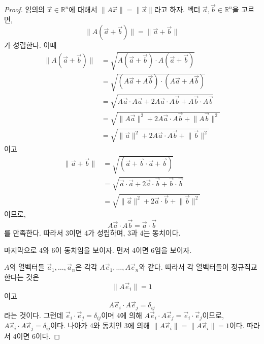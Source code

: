 \documentclass[sections/engineering_mathematics_lecture_note.tex]{subfiles}
\begin{document}
\begin{proof}
    임의의 $\vec x \in \mathbb R^n$에 대해서 $\lVert A \vec x \rVert = \lVert \vec x \rVert$라고 하자.
    벡터 $\vec a, \vec b \in \mathbb R^n$을 고르면,
    \begin{equation*}
        \lVert A (\vec a + \vec b) \rVert = \lVert \vec a + \vec b \rVert
    \end{equation*}
    가 성립한다.
    이때
    \begin{align*}
        \lVert A (\vec a + \vec b) \rVert &= \sqrt{A (\vec a + \vec b) \cdot A (\vec a + \vec b) }\\
                                          &= \sqrt{(A \vec a + A \vec b) \cdot (A \vec a + A \vec b)}\\
                                          &= \sqrt{A \vec a \cdot A \vec a + 2A \vec a \cdot A \vec b + A \vec b \cdot A \vec b}\\
                                          &= \sqrt{\lVert A \vec a \rVert^2 + 2A \vec a \cdot A \vec b + \lVert A \vec b \rVert^2}\\
                                          &= \sqrt{\lVert \vec a \rVert^2 + 2A \vec a \cdot A \vec b + \lVert \vec b \rVert^2}
    \end{align*}
    이고
    \begin{align*}
        \lVert \vec a + \vec b \rVert &= \sqrt{(\vec a + \vec b \cdot \vec a + \vec b)}\\
                                      &= \sqrt{\vec a \cdot \vec a + 2 \vec a \cdot \vec b + \vec b \cdot \vec b}\\
                                      &= \sqrt{\lVert \vec a \rVert^2 + 2 \vec a \cdot \vec b + \lVert \vec b \rVert^2}
    \end{align*}
    이므로,
    \begin{equation*}
        A \vec a \cdot A \vec b = \vec a \cdot \vec b
    \end{equation*}
    를 만족한다.
    따라서 3이면 4가 성립하며, 3과 4는 동치이다.

    마지막으로 4와 6이 동치임을 보이자. 먼저 4이면 6임을 보이자.

    $A$의 열벡터들 $\vec a_1, \dots, \vec a_n$은 각각 $A \vec e_1, \dots, A \vec e_n$와 같다.
    따라서 각 열벡터들이 정규직교한다는 것은
    \begin{equation*}
        \lVert A \vec e_i \rVert = 1
    \end{equation*}
    이고
    \begin{equation*}
        A \vec e_i \cdot A \vec e_j = \delta_{ij}
    \end{equation*}
    라는 것이다.
    그런데 $\vec e_i \cdot \vec e_j = \delta_{ij}$이며 4에 의해 $A \vec e_i \cdot A \vec e_j = \vec e_i \cdot \vec e_j$이므로, $A \vec e_i \cdot A \vec e_j = \delta_{ij}$이다.
    나아가 4와 동치인 3에 의해 $\lVert A \vec e_i\rVert = \lVert A \vec e_i \rVert = 1$이다.
    따라서 4이면 6이다.


\end{proof}
\end{document}
